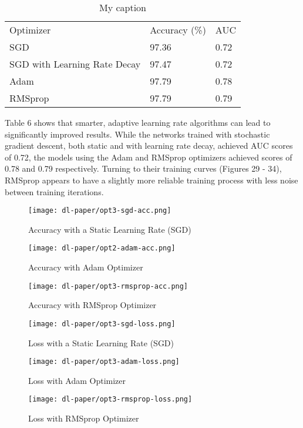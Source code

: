 \documentclass[12pt]{article}  %
\theoremstyle{definition}
\theoremstyle{remark}
\begin{document}
\begin{table}[]
\centering
\caption{My caption}
\label{my-label}
\begin{tabular}{lll}
Optimizer                    & Accuracy (\%) & AUC  \\
SGD                          & 97.36         & 0.72 \\
SGD with Learning Rate Decay & 97.47         & 0.72 \\
Adam                         & 97.79         & 0.78 \\
RMSprop                      & 97.79         & 0.79
\end{tabular}
\end{table}

\par Table 6 shows that smarter, adaptive learning rate algorithms can lead to significantly improved results. While the networks trained with stochastic gradient descent, both static and with learning rate decay, achieved AUC scores of 0.72, the models using the Adam and RMSprop optimizers achieved scores of 0.78 and 0.79 respectively. Turning to their training curves (Figures 29 - 34), RMSprop appears to have a slightly more reliable training process with less noise between training iterations. 

\begin{figure}[!htb]
  \texttt{[image: dl-paper/opt3-sgd-acc.png]}
  \caption{Accuracy with a Static Learning Rate (SGD)}\label{sgd-acc}
\endminipage\hfill
{}
  \texttt{[image: dl-paper/opt2-adam-acc.png]}
  \caption{Accuracy with Adam Optimizer}\label{adam-acc}
\endminipage\hfill
{}
  \texttt{[image: dl-paper/opt3-rmsprop-acc.png]}
  \caption{Accuracy with RMSprop Optimizer}\label{rmsprop-acc}
\endminipage
\end{figure}


\begin{figure}[!htb]
  \texttt{[image: dl-paper/opt3-sgd-loss.png]}
  \caption{Loss with a Static Learning Rate (SGD)}\label{sgd-loss}
\endminipage\hfill
{}
  \texttt{[image: dl-paper/opt3-adam-loss.png]}
  \caption{Loss with Adam Optimizer}\label{adam-loss}
\endminipage\hfill
{}
  \texttt{[image: dl-paper/opt3-rmsprop-loss.png]}
  \caption{Loss with RMSprop Optimizer}\label{rmsprop-loss}
\endminipage
\end{figure}
\end{document}
